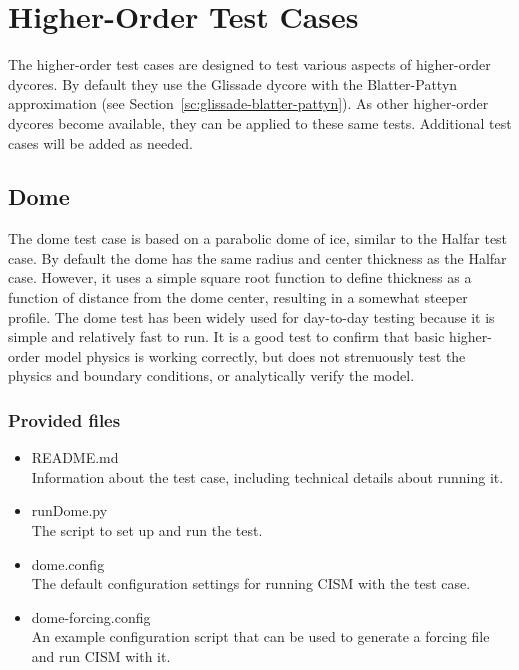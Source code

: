 
\section{Higher-Order Test Cases}
\label{sc:ho-tests}

The higher-order test cases are designed to test various aspects of higher-order dycores.
By default they use the Glissade dycore with the Blatter-Pattyn approximation 
(see Section~\ref{sc:glissade-blatter-pattyn}).
As other higher-order dycores become available, they can be applied
to these same tests. Additional test cases will be added as needed.

\subsection{Dome}
The dome test case is based on a parabolic dome of ice, similar to the Halfar test case.
By default the dome has the same radius and center thickness as the Halfar case.
However, it uses a simple square root function to define thickness as a function 
of distance from the dome center, resulting in a somewhat steeper profile.  
The dome test has been widely used for day-to-day testing
because it is simple and relatively fast to run.  It is a good test
to confirm that basic higher-order model physics is working correctly, but does
not strenuously test the physics and boundary conditions, or analytically verify the model.

\subsubsection{Provided files}

\begin{itemize}
	\item README.md \\
		Information about the test case, including technical details about running it.
	\item runDome.py \\
		The script to set up and run the test.
 	 \item dome.config \\
  		The default configuration settings for running CISM with the test case.
  	\item dome-forcing.config \\
  		An example configuration script that can be used to generate a forcing file and run CISM with it.
\end{itemize}

